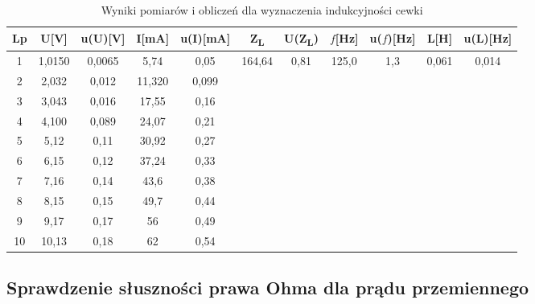 \documentclass[12pt]{article}
\begin{document}
\begin{table}[h]
    \centering
    \caption{Wyniki pomiarów i obliczeń dla wyznaczenia indukcyjności cewki}
    \label{tab:Wyniki pomiarów i obliczeń}
    \begin{tabular}{|c|c|c|c|c|c|c|c|c|c|c|} \hline
    Lp & U[V] & u(U)[V] & I[mA] & u(I)[mA] & Z\textsubscript{L} & U(Z\textsubscript{L}) & $f$[Hz] & u($f$)[Hz] & L[H] & u(L)[Hz] \\ \hline
    1 & 1,0150 & 0,0065 & 5,74 & 0,05 & \multirow{10}{*}{164,64} & \multirow{10}{*}{0,81} & \multirow{10}{*}{125,0} & \multirow{10}{*}{1,3} & \multirow{10}{*}{0,061} & \multirow{10}{*}{0,014} \\ \cline{1-5}
    2 & 2,032 & 0,012 & 11,320 & 0,099 & ~ & ~ & ~ & ~ & ~ & ~ \\ \cline{1-5}
    3 & 3,043 & 0,016 & 17,55 & 0,16 & ~ & ~ & ~ & ~ & ~ & ~ \\ \cline{1-5}
    4 & 4,100 & 0,089 & 24,07 & 0,21 & ~ & ~ & ~ & ~ & ~ & ~ \\ \cline{1-5}
    5 & 5,12 & 0,11 & 30,92 & 0,27 & ~ & ~ & ~ & ~ & ~ & ~ \\ \cline{1-5}
    6 & 6,15 & 0,12 & 37,24 & 0,33 & ~ & ~ & ~ & ~ & ~ & ~ \\ \cline{1-5}
    7 & 7,16 & 0,14 & 43,6 & 0,38 & ~ & ~ & ~ & ~ & ~ & ~ \\ \cline{1-5}
    8 & 8,15 & 0,15 & 49,7 & 0,44 & ~ & ~ & ~ & ~ & ~ & ~ \\ \cline{1-5}
    9 & 9,17 & 0,17 & 56 & 0,49 & ~ & ~ & ~ & ~ & ~ & ~ \\ \cline{1-5}
    10 & 10,13 & 0,18 & 62 & 0,54 & ~ & ~ & ~ & ~ & ~ & ~ \\ \hline
    \end{tabular}
\end{table}

\subsection{Sprawdzenie słuszności prawa Ohma dla prądu przemiennego}
\end{document}
